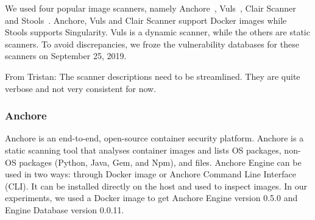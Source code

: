 \documentclass[a4paper,num-refs]{oup-contemporary}
\newcommand{\tristan}[1]{\color{blue}From Tristan: #1\color{black}}
\begin{document}


We used four popular image scanners, namely Anchore~\cite{github_2019},
Vuls~\cite{future-architect_2019}, Clair Scanner~\cite{arminc_2019} and
Stools~\cite{stools}. Anchore, Vuls and Clair Scanner support Docker
images while Stools supports Singularity. Vuls is a dynamic scanner, while the others
are static scanners. To avoid discrepancies, we froze the vulnerability
databases for these scanners on September 25, 2019.


\tristan{The scanner descriptions need to be streamlined. They are quite verbose and not very consistent for now.}

\subsubsection{Anchore}

Anchore is an end-to-end, open-source container security platform. Anchore
is a static
scanning tool that analyses container images and lists OS
packages, non-OS packages (Python, Java, Gem, and Npm), and files.
Anchore Engine can be used in two ways: through Docker image or Anchore
Command Line Interface (CLI).
It can be
installed directly on the host and used to inspect images.
In our experiments, we used a Docker image to get Anchore Engine version 0.5.0 and Engine Database
version 0.0.11.
\end{document}
